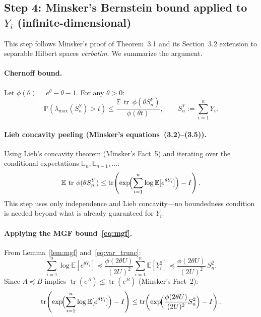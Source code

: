 \documentclass[11pt]{article}
\DeclareMathOperator{\tr}{tr}
\newcommand{\E}{\mathbb{E}}
\newcommand{\PP}{\mathbb{P}}
\begin{document}
\subsection*{Step 4: Minsker's Bernstein bound applied to $Y_i$ (infinite-dimensional)}

This step follows Minsker's proof of Theorem~3.1 and its Section~3.2 extension to separable Hilbert spaces \emph{verbatim}. We summarize the argument.

\paragraph{Chernoff bound.} Let $\phi(\theta)=e^\theta-\theta-1$. For any $\theta>0$:
\begin{equation}\label{eq:chernoff}
\PP(\lambda_{\max}(S_n^Y)>t)
\leq \frac{\E\,\tr\,\phi(\theta S_n^Y)}{\phi(\theta t)},
\qquad S_n^Y:=\sum_{i=1}^n Y_i.
\end{equation}

\paragraph{Lieb concavity peeling (Minsker's equations~(3.2)--(3.5)).}
Using Lieb's concavity theorem (Minsker's Fact~5) and iterating over the conditional expectations $\E_n,\E_{n-1},\ldots$:
\begin{equation}\label{eq:lieb}
\E\,\tr\,\phi(\theta S_n^Y)
\leq \tr\!\left(\exp\!\Bigl(\sum_{i=1}^n\log\E[e^{\theta Y_i}]\Bigr)-I\right).
\end{equation}
This step uses only independence and Lieb concavity---no boundedness condition is needed beyond what is already guaranteed for $Y_i$.

\paragraph{Applying the MGF bound~\eqref{eq:mgf}.}
From Lemma~\ref{lem:mgf} and~\eqref{eq:var_trunc}:
\[
\sum_{i=1}^n\log\E[e^{\theta Y_i}]
\preceq \frac{\phi(2\theta U)}{(2U)^2}\sum_{i=1}^n\E[Y_i^2]
\preceq \frac{\phi(2\theta U)}{(2U)^2}\,S_n^2.
\]
Since $A\preceq B$ implies $\tr(e^A)\leq\tr(e^B)$ (Minsker's Fact~2):
\begin{equation}\label{eq:trace_bound}
\tr\!\left(\exp\!\Bigl(\sum_{i=1}^n\log\E[e^{\theta Y_i}]\Bigr)-I\right)
\leq \tr\!\left(\exp\!\Bigl(\frac{\phi(2\theta U)}{(2U)^2}S_n^2\Bigr)-I\right).
\end{equation}
\end{document}
